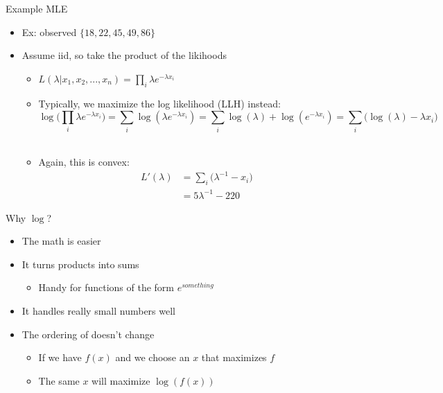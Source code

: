 \documentclass[aspectratio=169]{beamer}
\begin{document}
\begin{frame}{Example MLE}

\begin{itemize}
\item Ex: observed $\{18, 22, 45, 49, 86\}$
\item Assume iid, so take the product of the likihoods
\begin{itemize}
\item $L (\lambda | x_1, x_2, ..., x_n) = \prod_i \lambda e^{-\lambda x_i}$
\item Typically, we maximize the log likelihood (LLH) instead:
	$$ \log \Big( \prod_i \lambda e^{-\lambda x_i}\Big) = \sum_i \log (\lambda e^{-\lambda x_i}) =  \sum_i \log (\lambda) + \log ( e^{-\lambda x_i}) = \sum_i  \Big(\log (\lambda)  -\lambda x_i \Big)$$\\
\item Again, this is convex:
\begin{align}
L'(\lambda) &=  \sum_i \Big(  \lambda^{-1} -x_i \Big) \nonumber \\
	    &=   5 \lambda^{-1} -220   \nonumber 
\end{align}
\end{itemize}
\end{itemize}
\end{frame}

\begin{frame}{Why $\log$?}

\begin{itemize}
\item The math is easier
\item It turns products into sums 
\begin{itemize}
\item Handy for functions of the form $e^{something}$
\end{itemize}
\item It handles really small numbers well
\item The ordering of doesn't change
\begin{itemize}
\item If we have $f(x)$ and we choose an $x$ that maximizes $f$
\item The same $x$ will maximize $\log(f(x))$
\end{itemize}
\end{itemize}
\end{frame}
\end{document}
